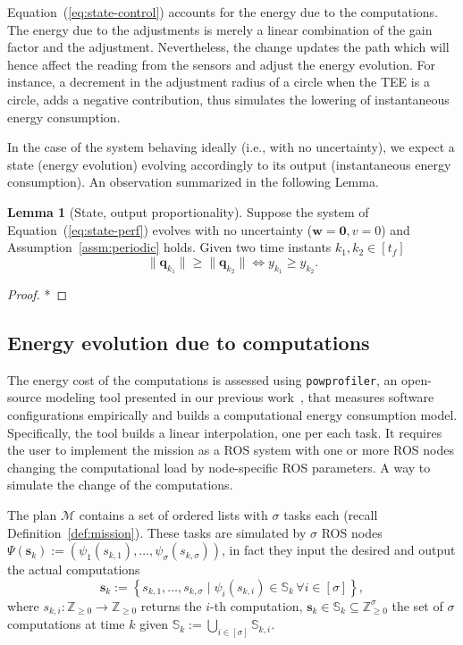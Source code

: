 \documentclass[letterpaper,10pt,conference]{ieeeconf}
\newcommand{\stt}[1]{{\small\tt #1}} %
\newcommand{\powprof}{\stt{powprofiler}}
\theoremstyle{definition}
\newtheorem{lem}[thm]{Lemma}
\begin{document}
Equation~(\ref{eq:state-control}) accounts for the energy due to the computations. The energy due to the adjustments is merely a linear combination of the gain factor and the adjustment. Nevertheless, the change updates the path which will hence affect the reading from the sensors and adjust the energy evolution. For instance, a decrement in the adjustment radius of a circle when the TEE is a circle, adds a negative contribution, thus simulates the lowering of instantaneous energy consumption.

In the case of the system behaving ideally (i.e., with no uncertainty), we expect a state (energy evolution) evolving accordingly to its output (instantaneous energy consumption). An observation summarized in the following Lemma.

\begin{lem}[State, output proportionality]\label{lem:state-vs-energy}
  Suppose the system of Equation~(\ref{eq:state-perf}) evolves with no uncertainty ($\mathbf{w}=\mathbf{0},v=0$) and Assumption~\ref{assm:periodic} holds. Given two time instants $k_1,k_2\in[t_f]$
  \begin{equation}
    \|\mathbf{q}_{k_1}\|\geq\|\mathbf{q}_{k_2}\|\iff y_{k_1}\geq y_{k_2}.
  \end{equation}
\end{lem}
\begin{proof}
  *
\end{proof}

\subsection{Energy evolution due to computations}
\label{sec:computations-model}

The energy cost of the computations is assessed using \powprof{}, an open-source modeling tool presented in our previous work~\cite{seewald2019coarse}, that measures software configurations empirically and builds a computational energy consumption model. Specifically, the tool builds a linear interpolation, one per each task. It requires the user to implement the mission as a ROS system with one or more ROS nodes changing the computational load by node-specific ROS parameters. A way to simulate the change of the computations.

The plan $\mathcal{M}$ contains a set of ordered lists with $\sigma$ tasks each (recall Definition~\ref{def:mission}). These tasks are simulated by $\sigma$ ROS nodes $\Psi(\mathbf{s}_k):=\left(\psi_1(s_{k,1}),\dots,\psi_\sigma(s_{k,\sigma})\right)$, in fact they input the desired and output the actual computations
\begin{equation}\label{eq:qos-def}
  \mathbf{s}_k:=\left\{s_{k,1},\dots ,s_{k,\sigma}\mid \psi_i(s_{k,i})\in\mathbb{S}_{k}\,\forall i\in[\sigma]\right\},
\end{equation}
where $s_{k,i}:\mathbb{Z}_{\geq 0}\rightarrow\mathbb{Z}_{\geq 0}$ returns the $i$-th computation, $\mathbf{s}_k\in\mathbb{S}_k\subseteq\mathbb{Z}_{\geq 0}^\sigma$ the set of $\sigma$ computations at time $k$ given $\mathbb{S}_k:=\bigcup_{i\in[\sigma]}{\mathbb{S}_{k,i}}$.
\end{document}
